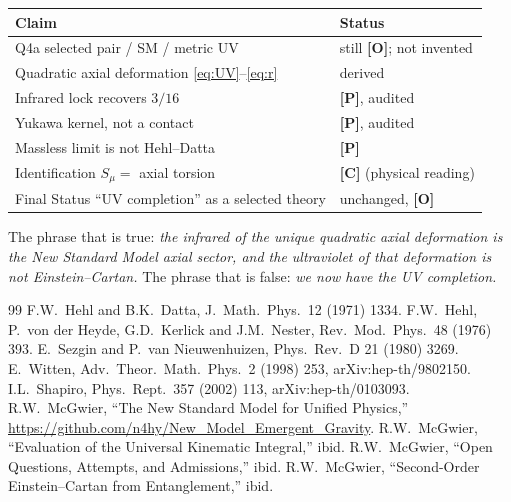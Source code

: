 \documentclass[11pt]{article}
\theoremstyle{definition}
\newcommand{\pP}{\textbf{[P]}}
\newcommand{\pC}{\textbf{[C]}}
\newcommand{\pO}{\textbf{[O]}}
\begin{document}
\begin{center}
\begin{tabular}{@{}p{}p{}@{}}
\toprule
Claim & Status \\
\midrule
Q4a selected pair / SM / metric UV & still \pO{}; not invented \\
Quadratic axial deformation \eqref{eq:UV}--\eqref{eq:r} & derived \\
Infrared lock recovers $3/16$ & \pP{}, audited \\
Yukawa kernel, not a contact & \pP{}, audited \\
Massless limit is not Hehl--Datta & \pP{} \\
Identification $S_\mu=$ axial torsion & \pC{} (physical reading) \\
Final Status ``UV completion'' as a selected theory & unchanged, \pO{} \\
\bottomrule
\end{tabular}
\end{center}

The phrase that is true: \emph{the infrared of the unique
quadratic axial deformation is the New Standard Model axial
sector, and the ultraviolet of that deformation is not
Einstein--Cartan.} The phrase that is false: \emph{we now have
the UV completion.}

\begin{thebibliography}{99}
F.W.~Hehl and B.K.~Datta,
J.\ Math.\ Phys.\ 12 (1971) 1334.
F.W.~Hehl, P.~von der Heyde, G.D.~Kerlick and J.M.~Nester,
Rev.\ Mod.\ Phys.\ 48 (1976) 393.
E.~Sezgin and P.~van Nieuwenhuizen,
Phys.\ Rev.\ D 21 (1980) 3269.
E.~Witten,
Adv.\ Theor.\ Math.\ Phys.\ 2 (1998) 253, arXiv:hep-th/9802150.
I.L.~Shapiro,
Phys.\ Rept.\ 357 (2002) 113, arXiv:hep-th/0103093.
R.W.~McGwier,
``The New Standard Model for Unified Physics,''
\url{https://github.com/n4hy/New_Model_Emergent_Gravity}.
R.W.~McGwier,
``Evaluation of the Universal Kinematic Integral,'' ibid.
R.W.~McGwier,
``Open Questions, Attempts, and Admissions,'' ibid.
R.W.~McGwier,
``Second-Order Einstein--Cartan from Entanglement,'' ibid.
\end{thebibliography}
\end{document}
